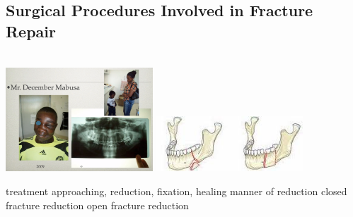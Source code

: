 \documentclass[
paper=landscape,
paper=160mm:90mm, %
fontsize=11pt, %
pagesize, %
parskip=half-, %
]{scrartcl} %
\newenvironment{WrapText1}[3][r]
{\wrapfigure[#2]{#1}{#3}}
{\endwrapfigure}
\newcommand{\wrapr}[6]{
\begin{minipage}{\linewidth}\mbox{}\\
\vspace{#1}
\begin{WrapText1}{#2}{#3}
\vspace{#4}#5\end{WrapText1}#6
\end{minipage}}
\theoremstyle{mythmstyle} %
\begin{document}
\clearpage
%
\subsection{Surgical Procedures Involved in Fracture Repair}

\wrapr{-8mm}{7}{6cm}{-1mm}
{%
\includegraphics[width=5.5cm]{Mabusa.png}
\includegraphics[width=5.5cm]{reduction_mandible.jpeg}
} %
{%
\begin{outline}
\1 treatment
    \2 approaching, reduction, fixation, healing
\1  manner of reduction
    \2 closed fracture reduction
    \2 open fracture reduction
\end{outline}
} %
\end{document}
